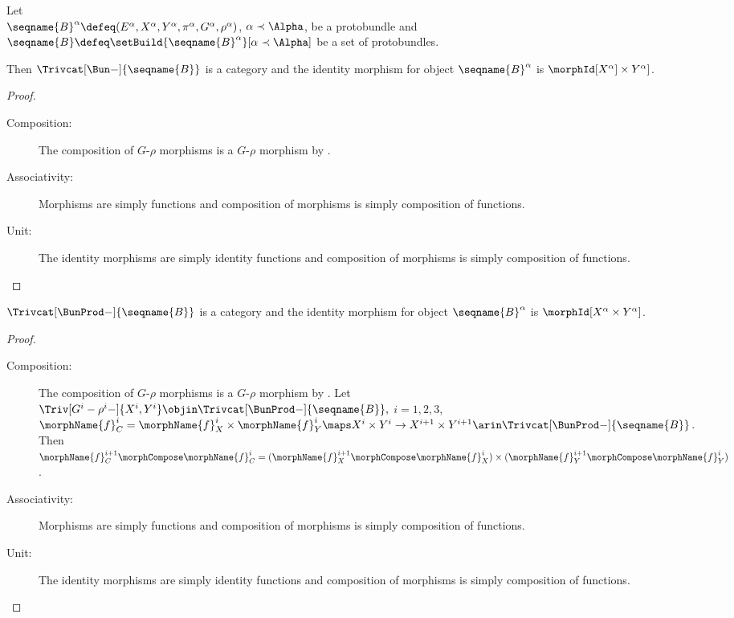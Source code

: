 \documentclass{article}
\begin{document}
\begin{lemma}
\label{lem:Grhomodtrivcat}
Let \\
$
  \seqname{B}^\alpha \defeq
  (E^\alpha, X^\alpha, Y^\alpha, \pi^\alpha, G^\alpha, \rho^\alpha)
$,
$\alpha \prec \Alpha$, be a protobundle and
$\seqname{B} \defeq \setBuild{{\seqname{B}^\alpha}}[\alpha \prec \Alpha]$
be a set of protobundles.

Then $\Trivcat[\Bun-]{\seqname{B}}$ is a category and the identity
morphism for object $\seqname{B}^\alpha$ is
$\morphId[{X^\alpha] \times Y^\alpha}]$.

\begin{proof}
\leavevmode
\begin{description}
\item[Composition:]
The composition of $G$-$\rho$ morphisms is a $G$-$\rho$ morphism by
.
\item[Associativity:]
Morphisms are simply functions and composition of morphisms is simply
composition of functions.
\item[Unit:]
The identity morphisms are simply identity functions and composition of
morphisms is simply composition of functions.
\end{description}
\end{proof}

$\Trivcat[\BunProd-]{\seqname{B}}$ is a category and the identity
morphism for object $\seqname{B}^\alpha$ is
$\morphId[{X^\alpha \times Y^\alpha}]$.

\begin{proof}
\leavevmode
\begin{description}
\item[Composition:]
The composition of $G$-$\rho$ morphisms is a $G$-$\rho$ morphism by
. Let
$\Triv[G^i-\rho^i-]{X^i,Y^i} \objin\Trivcat[\BunProd-]{\seqname{B}},$
$i=1,2,3$,
$
  \morphName{f}^i_C =
  \morphName{f}^i_X \times \morphName{f}^i_Y \maps
  X^i \times Y^i \to X^{i+1} \times Y^{i+1}
  \arin  \Trivcat[\BunProd-]{\seqname{B}}
$.
Then
$
  \morphName{f}^{i+1}_C \morphCompose \morphName{f}^i_C =
  (\morphName{f}^{i+1}_X \morphCompose \morphName{f}^i_X)
  \times
  (\morphName{f}^{i+1}_Y \morphCompose \morphName{f}^i_Y)
$.

\item[Associativity:]
Morphisms are simply functions and composition of morphisms is simply
composition of functions.

\item[Unit:]
The identity morphisms are simply identity functions and composition of
morphisms is simply composition of functions.
\end{description}
\end{proof}
\end{lemma}
\end{document}
